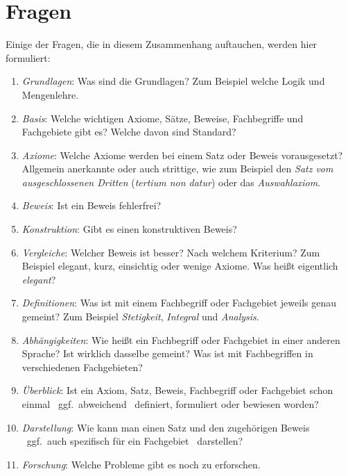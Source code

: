 \documentclass[english,ngerman,parskip=half,headsepline,footsepline]{scrreprt}
\makeatletter
\newcommand{\textggf}{ggf.\@}
\makeatother
\begin{document}
	\section{Fragen} %
	\label{sec:Fragen}
	Einige der Fragen, die in diesem Zusammenhang auftauchen, werden hier formuliert:

	\begin{enumerate}

		\item \label{Frage:Grundlagen} \emph{Grundlagen}: Was sind die Grundlagen? Zum Beispiel welche Logik und Mengenlehre.

		\item \label{Frage:Basis} \emph{Basis}: Welche wichtigen Axiome, Sätze, Beweise, Fachbegriffe und Fachgebiete gibt es? Welche davon sind Standard?

		\item \label{Frage:Axiome} \emph{Axiome}: Welche Axiome werden bei einem Satz oder Beweis vorausgesetzt? Allgemein anerkannte oder auch strittige, wie zum Beispiel den \emph{Satz vom ausgeschlossenen Dritten} (\emph{tertium non datur}) oder das \emph{Auswahlaxiom}.

		\item \label{Frage:Beweis} \emph{Beweis}: Ist ein Beweis fehlerfrei?

		\item \label{Frage:Konstruktion} \emph{Konstruktion}: Gibt es einen konstruktiven Beweis?

		\item \label{Frage:Vergleiche} \emph{Vergleiche}: Welcher Beweis ist besser? Nach welchem Kriterium? Zum Beispiel elegant, kurz, einsichtig oder wenige Axiome. Was heißt eigentlich \emph{elegant}?

		\item \label{Frage:Definitionen} \emph{Definitionen}: Was ist mit einem Fachbegriff oder Fachgebiet jeweils genau gemeint? Zum Beispiel \emph{Stetigkeit}, \emph{Integral} und \emph{Analysis}.

		\item \label{Frage:Abhängigkeiten} \emph{Abhängigkeiten}: Wie heißt ein Fachbegriff oder Fachgebiet in einer anderen Sprache? Ist wirklich dasselbe gemeint? Was ist mit Fachbegriffen in verschiedenen Fachgebieten?

		\item \label{Frage:Überblick} \emph{Überblick}: Ist ein Axiom, Satz, Beweis, Fachbegriff oder Fachgebiet schon einmal \textendash\ \textggf\ abweichend \textendash\ definiert, formuliert oder bewiesen worden?

		\item \label{Frage:Darstellung} \emph{Darstellung}: Wie kann man einen Satz und den zugehörigen Beweis \textendash\ \textggf\ auch spezifisch für ein Fachgebiet \textendash\ darstellen?

		\item \label{Frage:Forschung} \emph{Forschung}: Welche Probleme gibt es noch zu erforschen.

	\end{enumerate}
\end{document}
